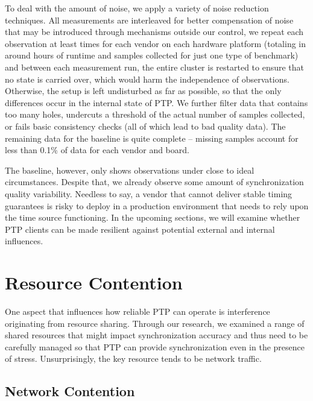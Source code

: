 {To deal with the amount of noise, we apply a variety of noise reduction techniques. All measurements are interleaved for better compensation of noise that may be introduced through mechanisms outside our control, we repeat each observation at least \numBaselineMeasurements{} times for each vendor on each hardware platform (totaling in around  hours of runtime and  samples collected for just one type of benchmark) and between each measurement run, the entire cluster is restarted to ensure that no state is carried over, which would harm the independence of observations. Otherwise, the setup is left undisturbed as far as possible, so that the only differences occur in the internal state of PTP. We further filter data that contains too many holes, undercuts a threshold of the actual number of samples collected, or fails basic consistency checks (all of which lead to bad quality data). The remaining data for the baseline is quite complete -- missing samples account for less than 0.1\% of data for each vendor and board.

The baseline, however, only shows observations under close to ideal circumstances. Despite that, we already observe some amount of synchronization quality variability.
Needless to say, a vendor that cannot deliver stable timing guarantees is risky to deploy in a production environment that needs to rely upon the time source functioning. In the upcoming sections, we will examine whether PTP clients can be made resilient against potential external and internal influences.

}

\section{Resource Contention}
\label{sec:resource_contention}

One aspect that influences how reliable PTP can operate is interference originating from resource sharing. Through our research, we examined a range of shared resources that might impact synchronization accuracy and thus need to be carefully managed so that PTP can provide synchronization even in the presence of stress. Unsurprisingly, the key resource tends to be network traffic.

\subsection{Network Contention}

